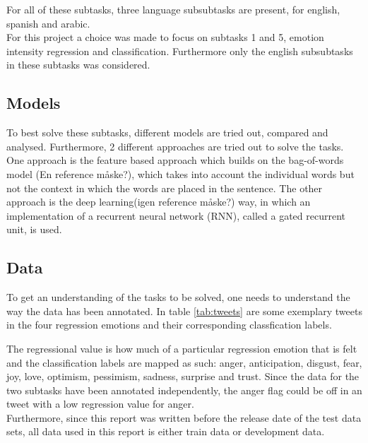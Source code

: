For all of these subtasks, three language subsubtasks are present, for english, spanish and arabic.\\ 
For this project a choice was made to focus on subtasks 1 and 5, emotion intensity regression and classification. Furthermore only the english subsubtasks in these subtasks was considered.
\subsection{Models}
To best solve these subtasks, different models are tried out, compared and analysed. Furthermore, 2 different approaches are tried out to solve the tasks. One approach is the feature based approach which builds on the bag-of-words model (En reference måske?), which takes into account the individual words but not the context in which the words are placed in the sentence. The other approach is the deep learning(igen reference måske?) way, in which an implementation of a recurrent neural network (RNN), called a gated recurrent unit, is used.

\subsection{Data} \label{sec:introdata}
To get an understanding of the tasks to be solved, one needs to understand the way the data has been annotated. In table \ref{tab:tweets} are some exemplary tweets in the four regression emotions and their corresponding classfication labels.\\
\begin{table}[h]
\caption{Exemplary tweets with regression and clasification labels}
\label{tab:tweets}
\end{table}
The regressional value is how much of a particular regression emotion that is felt and the classification labels are mapped as such: anger, anticipation, disgust, fear, joy, love, optimism, pessimism, sadness, surprise and trust. Since the data for the two subtasks have been annotated independently, the anger flag could be off in an tweet with a low regression value for anger. \\
Furthermore, since this report was written before the release date of the test data sets, all data used in this report is either train data or development data.